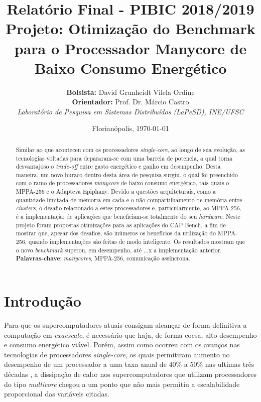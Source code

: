 \documentclass[a4paper,11pt]{article}
\title{\hspace{-0.6cm}\textbf{Relatório Final - PIBIC 2018/2019}\\[0.2cm] \hspace{-0.6cm}\textbf{Projeto:} Otimização do Benchmark \capb para o Processador Manycore de Baixo Consumo Energético \mppa}
\author{\hspace{-0.6cm}\textbf{Bolsista:} David Grunheidt Vilela Ordine\\\hspace{-0.6cm}\textbf{Orientador:} Prof. Dr. Márcio Castro\\ \hspace{-0.6cm}\small{\emph{Laboratório de Pesquisa em Sistemas Distribuídos (LaPeSD), INE/UFSC}}}
\date{\hspace{-0.6cm}\small{Florianópolis, \today}}
\newcommand{\mppa}{MPPA-256\xspace}
\newcommand{\capb}{CAP Bench\xspace}
\newcommand{\epiphany}{Adapteva Epiphany\xspace}
\newcommand{\manycore}{\textit{manycore}\xspace}
\begin{document}
%

\maketitle

\begin{abstract}
Similar ao que aconteceu com os processadores \textit{single-core}, ao longo de sua evolução, as tecnologias voltadas para \hpc depararam-se com uma barreia de potencia, a qual torna desvantajoso o \textit{trade-off} entre gasto energético e ganho em desempenho. Desta maneira, um novo buraco dentro desta área de pesquisa surgiu, o qual foi preenchido com o ramo de processadores \manycore de baixo consumo energético, tais quais o \mppa e o \epiphany. Devido a questões arquiteturais, como a quantidade limitada de memoria em cada \cc e o não compartilhamento de memória entre \textit{clusters}, o desafio relacionado a estes processadores e, particularmente, ao \mppa, é a implementação de aplicações que beneficiam-se totalmente do seu \textit{hardware}. Neste projeto foram propostas otimizações para as aplicações do \capb, a fim de mostrar que, apesar dos desafios, são inúmeros os benefícios da utilização do \mppa, quando implementações são feitas de modo inteligente. Os resultados mostram que o novo \textit{benchmark} superou, em desempenho, até ...x a implementação anterior. \\

\noindent\textbf{Palavras-chave}: \textit{manycores}, MPPA-256, comunicação assíncrona.
\end{abstract}

\tableofcontents

\newpage

\section{Introdução}


Para que os supercomputadores atuais consigam alcançar de forma definitiva a computação em \textit{exaescale}, é necessário que haja, de forma coesa, alto desempenho e consumo energético viável. Porém, assim como ocorreu com os avanços nas tecnologias de processadores \textit{single-core}, os quais permitiram aumento no desempenho de um processador a uma taxa anual de 40\% a 50\% nas ultimas três décadas \cite{Larus:2008:TM:1364782.1364800}, a dissipação de calor nos supercomputadores que utilizam processadores do tipo \textit{multicore} chegou a um ponto que não mais permitiu a escalabilidade proporcional das variáveis citadas.
 
\end{document}
